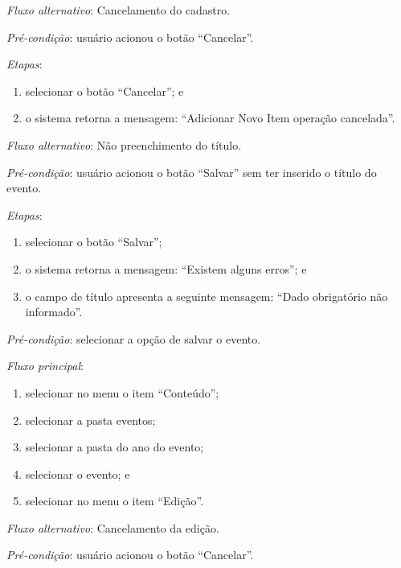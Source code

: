 \noindent \textit{Fluxo alternativo}: Cancelamento do cadastro.

\noindent \textit{Pré-condição}:  usuário acionou o botão ``Cancelar''.

\noindent \textit{Etapas}:

\begin{enumerate}
    \item selecionar o botão ``Cancelar''; e
    \item o sistema retorna a mensagem: ``Adicionar Novo Item operação cancelada''.
\end{enumerate}

\noindent \textit{Fluxo alternativo}: Não preenchimento do título.

\noindent \textit{Pré-condição}: usuário acionou o botão ``Salvar'' sem ter inserido o título do evento.

\noindent \textit{Etapas}:

\begin{enumerate}
    \item selecionar o botão ``Salvar'';
    \item o sistema retorna a mensagem: ``Existem alguns erros''; e
    \item o campo de título apresenta a seguinte mensagem: ``Dado obrigatório não informado''.
\end{enumerate}



\vspace{0.7cm}

\noindent \textit{Pré-condição}: selecionar a opção de salvar o evento.

\noindent \textit{Fluxo principal}:

\begin{enumerate}
    \item selecionar no menu o item ``Conteúdo'';
    \item selecionar a pasta eventos;
    \item selecionar a pasta do ano do evento;
    \item selecionar o evento; e
    \item selecionar no menu o item ``Edição''.
\end{enumerate}

\noindent \textit{Fluxo alternativo}: Cancelamento da edição.

\noindent \textit{Pré-condição}: usuário acionou o botão ``Cancelar''.

